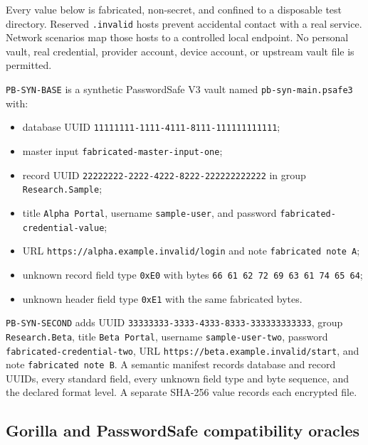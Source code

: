 \documentclass[
  letterpaper,
]{article}
\newcommand{\passthrough}[1]{#1}
\providecommand{\tightlist}{%
  \setlength{\itemsep}{0pt}\setlength{\parskip}{0pt}}
\begin{document}
Every value below is fabricated, non-secret, and confined to a disposable test directory. Reserved
\passthrough{\lstinline!.invalid!} hosts prevent accidental contact with a real service. Network scenarios map those
hosts to a controlled local endpoint. No personal vault, real credential, provider account, device account, or upstream
vault file is permitted.

\nolinkurl{PB-SYN-BASE} is a synthetic PasswordSafe V3 vault named \nolinkurl{pb-syn-main.psafe3} with:

\begin{itemize}
\tightlist
\item
  database UUID \nolinkurl{11111111-1111-4111-8111-111111111111};
\item
  master input \nolinkurl{fabricated-master-input-one};
\item
  record UUID \nolinkurl{22222222-2222-4222-8222-222222222222} in group \nolinkurl{Research.Sample};
\item
  title \passthrough{\lstinline!Alpha Portal!}, username \nolinkurl{sample-user}, and password
  \nolinkurl{fabricated-credential-value};
\item
  URL \nolinkurl{https://alpha.example.invalid/login} and note \passthrough{\lstinline!fabricated note A!};
\item
  unknown record field type \passthrough{\lstinline!0xE0!} with bytes
  \passthrough{\lstinline!66 61 62 72 69 63 61 74 65 64!};
\item
  unknown header field type \passthrough{\lstinline!0xE1!} with the same fabricated bytes.
\end{itemize}

\nolinkurl{PB-SYN-SECOND} adds UUID \nolinkurl{33333333-3333-4333-8333-333333333333}, group \nolinkurl{Research.Beta},
title \passthrough{\lstinline!Beta Portal!}, username \nolinkurl{sample-user-two}, password
\nolinkurl{fabricated-credential-two}, URL \nolinkurl{https://beta.example.invalid/start}, and note
\passthrough{\lstinline!fabricated note B!}. A semantic manifest records database and record UUIDs, every standard
field, every unknown field type and byte sequence, and the declared format level. A separate SHA-256 value records each
encrypted file.

\subsection{Gorilla and PasswordSafe compatibility oracles}\label{gorilla-and-passwordsafe-compatibility-oracles}
\end{document}
